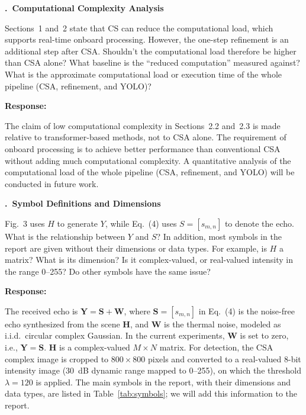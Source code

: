 \documentclass[12pt]{article}
\newcounter{comment}
\newcommand{\comment}[2]{%
  \refstepcounter{comment}%
  \par\bigskip\noindent\textbf{\thecomment.\ #1}\par\smallskip
  \noindent #2\par\medskip
}
\newcommand{\response}{\par\noindent\textbf{Response:}\par}
\begin{document}
\comment{Computational Complexity Analysis}{%
  Sections~1 and~2 state that CS can
  reduce the computational load, which supports real-time onboard
  processing. However, the one-step refinement is an additional step after
  CSA. Shouldn't the computational load therefore be higher than CSA alone?
  What baseline is the ``reduced computation'' measured against? What is the
  approximate computational load or execution time of the whole pipeline
  (CSA, refinement, and YOLO)?}

\response
The claim of low computational complexity in Sections~2.2 and~2.3 is made
relative to transformer-based methods, not to CSA alone. The requirement of
onboard processing is to achieve better performance than conventional CSA
without adding much computational complexity. A quantitative analysis of the
computational load of the whole pipeline (CSA, refinement, and YOLO) will be
conducted in future work.

\comment{Symbol Definitions and Dimensions}{%
  Fig.~3 uses $H$ to generate $Y$, while
  Eq.~(4) uses $S = [s_{m,n}]$ to denote the echo. What is the relationship
  between $Y$ and $S$? In addition, most symbols in the report are given
  without their dimensions or data types. For example, is $H$ a matrix? What
  is its dimension? Is it complex-valued, or real-valued intensity in the
  range 0--255? Do other symbols have the same issue?}

\response
The received echo is $\mathbf{Y} = \mathbf{S} + \mathbf{W}$, where
$\mathbf{S} = [s_{m,n}]$ in Eq.~(4) is the noise-free echo synthesized from the
scene $\mathbf{H}$, and $\mathbf{W}$ is the thermal noise, modeled as i.i.d.\
circular complex Gaussian. In the current experiments, $\mathbf{W}$ is set to
zero, i.e., $\mathbf{Y} = \mathbf{S}$. $\mathbf{H}$ is a complex-valued $M \times N$
matrix. For detection, the CSA complex image is cropped to $800 \times 800$ pixels and
converted to a real-valued 8-bit intensity image (30~dB dynamic range mapped
to 0--255), on which the threshold $\lambda = 120$ is applied. The main symbols
in the report, with their dimensions and data types, are listed in
Table~\ref{tab:symbols}; we will add this information to the report.
\end{document}
